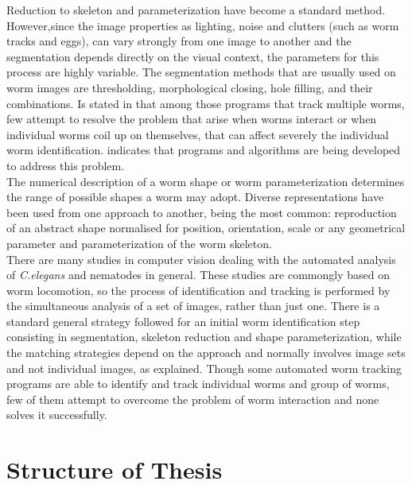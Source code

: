 Reduction to skeleton and parameterization have become a standard method. 
However,since the image properties as lighting, noise and clutters 
(such as worm tracks and eggs), can vary strongly from one image to another and 
the segmentation depends directly on the visual context, the  
parameters for this process are highly variable. The segmentation methods 
that are usually used 
on worm images are thresholding, morphological closing, 
hole filling, and their combinations.
Is stated in \cite{automated} that among those programs that track 
multiple worms, few attempt to resolve the problem that arise when 
worms interact or when individual worms coil up on themselves, that can
affect severely the individual worm identification. \cite{huang} indicates
that programs and algorithms are being developed to address this problem.\\

The  numerical description of a worm shape or worm parameterization 
determines the range of possible shapes a worm may adopt. Diverse 
representations have been used from one approach to another, being the 
most common: reproduction of an abstract shape normalised for position, 
orientation, scale or any geometrical parameter and parameterization of the 
worm skeleton.\\

There are many studies in computer vision dealing with the automated
analysis of \emph{C.elegans} and nematodes in general. These studies are
commongly based on worm locomotion, so the process of identification and 
tracking is performed by the simultaneous analysis of a set of images, rather
than just one. There is a standard general strategy followed for an initial
worm identification step consisting in segmentation, skeleton reduction and
shape parameterization, while the matching strategies depend on the approach
and normally involves image sets and not individual images, as explained.
Though some automated worm tracking programs are able to identify and track
individual worms and group of worms, few of them attempt to overcome the 
problem of worm interaction and none solves it successfully.

\section{Structure of Thesis}